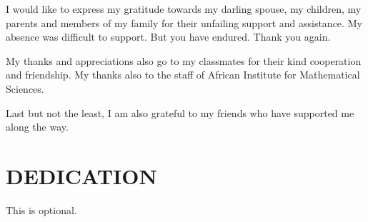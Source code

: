 I would like to express my gratitude towards  my darling spouse, my children, my parents and members  of my family for their unfailing support and assistance. My absence was difficult to support. But you have endured. Thank you again.

My thanks and appreciations also go to my classmates for their kind cooperation and friendship. My thanks also to the staff of African Institute for Mathematical Sciences.

Last but not the least, I am also grateful to my friends who have supported me along the way.

\newpage
\chapter*{DEDICATION} 

This is optional.